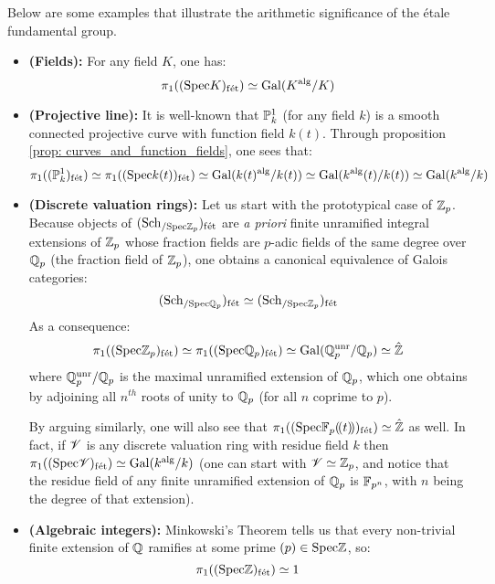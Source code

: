         Below are some examples that illustrate the arithmetic significance of the \'etale fundamental group.
        \begin{example} \label{example: etale_fundamental_groups}
            \noindent
            \begin{itemize}
                \item \textbf{(Fields):} For any field $K$, one has:
                    $$\pi_1((\Spec K)_{\fet}) \cong \Gal(K^{\alg}/K)$$
                \item \textbf{(Projective line):} It is well-known that $\P^1_k$ (for any field $k$) is a smooth connected projective curve with function field $k(t)$. Through proposition \ref{prop: curves_and_function_fields}, one sees that:
                    $$\pi_1((\P^1_k)_{\fet}) \cong \pi_1((\Spec k(t))_{\fet}) \cong \Gal(k(t)^{\alg}/k(t)) \cong \Gal(k^{\alg}(t)/k(t)) \cong \Gal(k^{\alg}/k)$$
                \item \textbf{(Discrete valuation rings):} Let us start with the prototypical case of $\Z_p$. Because objects of $(\Sch_{/\Spec \Z_p})_{\fet}$ are \textit{a priori} finite unramified integral extensions of $\Z_p$ whose fraction fields are $p$-adic fields of the same degree over $\Q_p$ (the fraction field of $\Z_p$), one obtains a canonical equivalence of Galois categories:
                    $$(\Sch_{/\Spec \Q_p})_{\fet} \cong (\Sch_{/\Spec \Z_p})_{\fet}$$
                As a consequence:
                    $$\pi_1((\Spec \Z_p)_{\fet}) \cong \pi_1((\Spec \Q_p)_{\fet}) \cong \Gal(\Q_p^{\unr}/\Q_p) \cong \hat{\Z}$$
                where $\Q_p^{\unr}/\Q_p$ is the maximal unramified extension of $\Q_p$, which one obtains by adjoining all $n^{th}$ roots of unity to $\Q_p$ (for all $n$ coprime to $p$).
                
                By arguing similarly, one will also see that $\pi_1((\Spec \F_p(\!(t)\!))_{\fet}) \cong \hat{\Z}$ as well. In fact, if $\scrV$ is any discrete valuation ring with residue field $k$ then $\pi_1((\Spec \scrV)_{\fet}) \cong \Gal(k^{\alg}/k)$ (one can start with $\scrV \cong \Z_p$, and notice that the residue field of any finite unramified extension of $\Q_p$ is $\F_{p^n}$, with $n$ being the degree of that extension).
                \item \textbf{(Algebraic integers):} Minkowski's Theorem tells us that every non-trivial finite extension of $\Q$ ramifies at some prime $(p) \in \Spec \Z$, so:
                    $$\pi_1((\Spec \Z)_{\fet}) \cong 1$$
            \end{itemize}
        \end{example}
    
